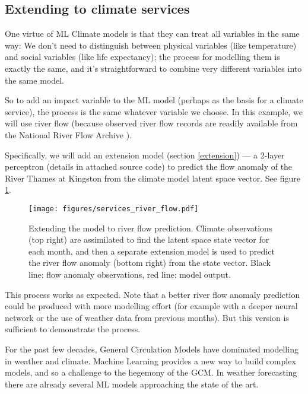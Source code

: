 \documentclass[gmd]{copernicus}
\begin{document}
\subsection{Extending to climate services}

One virtue of ML Climate models is that they can treat all variables in the same way: We don't need to distinguish between physical variables (like temperature) and social variables (like life expectancy); the process for modelling them is exactly the same, and it's straightforward to combine very different variables into the same model.

So to add an impact variable to the ML model (perhaps as the basis for a climate service), the process is the same whatever variable we choose. In this example, we will use river flow (because observed river flow records are readily available from the National River Flow Archive \citep{NRFA}).

Specifically, we will add an extension model (section \ref{extension}) --- a 2-layer perceptron (details in attached source code) to predict the flow anomaly of the River Thames at Kingston \citep{NRFA-Kingston} from the climate model latent space vector. See figure \ref{services_river_flow}.

\begin{figure}[h]
\texttt{[image: figures/services\_river\_flow.pdf]}
\caption{Extending the model to river flow prediction. Climate observations (top right) are assimilated to find the latent space state vector for each month, and then a separate extension model is used to predict the river flow anomaly (bottom right) from the state vector. Black line: flow anomaly observations, red line: model output.}
\label{services_river_flow}
\end{figure}
         
This process works as expected. Note that a better river flow anomaly prediction could be produced with more modelling effort (for example with a deeper neural network or the use of weather data from previous months). But this version is sufficient to demonstrate the process.


\conclusions  %

For the past few decades, General Circulation Models have dominated modelling in weather and climate. Machine Learning provides a new way to build complex models, and so a challenge to the hegemony of the GCM. In weather forecasting there are already several ML models approaching the state of the art. 
\end{document}
